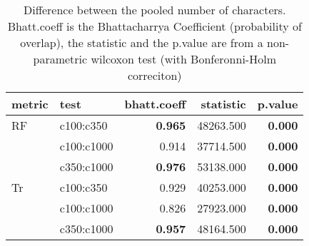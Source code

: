 \begin{table}[ht]
\centering
\begin{tabular}{llr|rr}
  \hline
metric & test & bhatt.coeff & statistic & p.value \\ 
  \hline
RF & c100:c350 & \textbf{0.965} & 48263.500 & \textbf{0.000} \\ 
   & c100:c1000 & 0.914 & 37714.500 & \textbf{0.000} \\ 
   & c350:c1000 & \textbf{0.976} & 53138.000 & \textbf{0.000} \\ 
  Tr & c100:c350 & 0.929 & 40253.000 & \textbf{0.000} \\ 
   & c100:c1000 & 0.826 & 27923.000 & \textbf{0.000} \\ 
   & c350:c1000 & \textbf{0.957} & 48164.500 & \textbf{0.000} \\ 
   \hline
\end{tabular}
\caption{Difference between the pooled number of characters. Bhatt.coeff is the Bhattacharrya Coefficient (probability of overlap), the statistic and the p.value are from a non-parametric wilcoxon test (with Bonferonni-Holm correciton)} 
\label{Tab_pooledscharacters_test}
\end{table}
